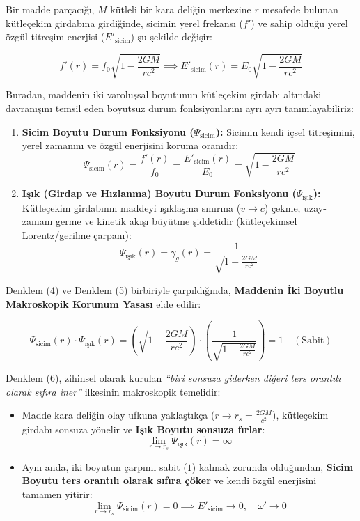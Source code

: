 \documentclass[12pt,a4paper]{article}
\begin{document}
Bir madde parçacığı, $M$ kütleli bir kara deliğin merkezine $r$ mesafede bulunan kütleçekim girdabına girdiğinde, sicimin yerel frekansı ($f'$) ve sahip olduğu yerel özgül titreşim enerjisi ($E'_{\text{sicim}}$) şu şekilde değişir:

\begin{equation}
f'(r) = f_0 \sqrt{1 - \frac{2GM}{rc^2}} \implies E'_{\text{sicim}}(r) = E_0 \sqrt{1 - \frac{2GM}{rc^2}}
\end{equation}

Buradan, maddenin iki varoluşsal boyutunun kütleçekim girdabı altındaki davranışını temsil eden boyutsuz durum fonksiyonlarını ayrı ayrı tanımlayabiliriz:

\begin{enumerate}
    \item \textbf{Sicim Boyutu Durum Fonksiyonu ($\Psi_{\text{sicim}}$):} Sicimin kendi içsel titreşimini, yerel zamanını ve özgül enerjisini koruma oranıdır:
    \begin{equation}
    \Psi_{\text{sicim}}(r) = \frac{f'(r)}{f_0} = \frac{E'_{\text{sicim}}(r)}{E_0} = \sqrt{1 - \frac{2GM}{rc^2}}
    \end{equation}
    \item \textbf{Işık (Girdap ve Hızlanma) Boyutu Durum Fonksiyonu ($\Psi_{\text{ışık}}$):} Kütleçekim girdabının maddeyi ışıklaşma sınırına ($v \to c$) çekme, uzay-zamanı germe ve kinetik akışı büyütme şiddetidir (kütleçekimsel Lorentz/gerilme çarpanı):
    \begin{equation}
    \Psi_{\text{ışık}}(r) = \gamma_g(r) = \frac{1}{\sqrt{1 - \frac{2GM}{rc^2}}}
    \end{equation}
\end{enumerate}

Denklem (4) ve Denklem (5) birbiriyle çarpıldığında, \textbf{Maddenin İki Boyutlu Makroskopik Korunum Yasası} elde edilir:

\begin{equation}
\Psi_{\text{sicim}}(r) \cdot \Psi_{\text{ışık}}(r) = \left( \sqrt{1 - \frac{2GM}{rc^2}} \right) \cdot \left( \frac{1}{\sqrt{1 - \frac{2GM}{rc^2}}} \right) = 1 \quad (\text{Sabit})
\end{equation}

Denklem (6), zihinsel olarak kurulan \textit{``biri sonsuza giderken diğeri ters orantılı olarak sıfıra iner''} ilkesinin makroskopik temelidir:
\begin{itemize}
    \item Madde kara deliğin olay ufkuna yaklaştıkça ($r \to r_s = \frac{2GM}{c^2}$), kütleçekim girdabı sonsuza yönelir ve \textbf{Işık Boyutu sonsuza fırlar}:
    \[
    \lim_{r \to r_s} \Psi_{\text{ışık}}(r) = \infty
    \]
    \item Aynı anda, iki boyutun çarpımı sabit ($1$) kalmak zorunda olduğundan, \textbf{Sicim Boyutu ters orantılı olarak sıfıra çöker} ve kendi özgül enerjisini tamamen yitirir:
    \[
    \lim_{r \to r_s} \Psi_{\text{sicim}}(r) = 0 \implies E'_{\text{sicim}} \to 0, \quad \omega' \to 0
    \]
\end{itemize}
\end{document}
